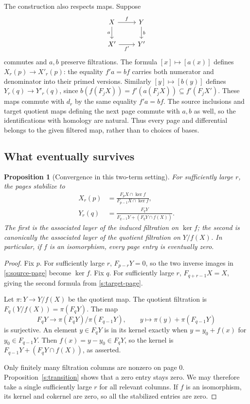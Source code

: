 \documentclass[11pt]{article}
\newtheorem{proposition}[theorem]{Proposition}
\theoremstyle{definition}
\theoremstyle{remark}\newtheorem{remark}[theorem]{Remark}
\DeclareMathOperator{\Ker}{ker}
\begin{document}
The construction also respects maps. Suppose
\[
\begin{tikzcd}
X\arrow[r,"f"]\arrow[d,"a"']&Y\arrow[d,"b"]\\
X'\arrow[r,"f'"']&Y'
\end{tikzcd}
\]
commutes and $a,b$ preserve filtrations. The formula $[x]\mapsto[a(x)]$
defines $X_r(p)\to X'_r(p)$: the equality $f'a=bf$ carries both numerator
and denominator into their primed versions. Similarly $[y]\mapsto[b(y)]$
defines $Y_r(q)\to Y'_r(q)$, since
$b(f(F_jX))=f'(a(F_jX))\subseteq f'(F_jX')$. These maps commute with
$d_r$ by the same equality $f'a=bf$. The source inclusions and target
quotient maps defining the next page commute with $a,b$ as well, so
the identifications with homology are natural. Thus every page and differential
belongs to the given filtered map, rather than to choices of bases.

\subsection{What eventually survives}

\begin{proposition}[Convergence in this two-term setting]\label{s:convergence}
For sufficiently large $r$, the pages stabilize to
\begin{align*}
X_r(p)&=
\frac{F_pX\cap\Ker f}{F_{p-1}X\cap\Ker f},\\
Y_r(q)&=
\frac{F_qY}{F_{q-1}Y+(F_qY\cap f(X))}.
\end{align*}
The first is the associated layer of the induced filtration on $\Ker f$;
the second is canonically the associated layer of the quotient filtration
on $Y/f(X)$. In particular, if $f$ is an isomorphism, every page entry
is eventually zero.
\end{proposition}

\begin{proof}
Fix $p$. For sufficiently large $r$, $F_{p-r}Y=0$, so the two inverse
images in \eqref{s:source-page} become $\Ker f$. Fix $q$. For sufficiently
large $r$, $F_{q+r-1}X=X$, giving the second formula from
\eqref{s:target-page}.

Let $\pi:Y\to Y/f(X)$ be the quotient map. The quotient filtration is
$F_q(Y/f(X))=\pi(F_qY)$. The map
\[
F_qY\longrightarrow\pi(F_qY)/\pi(F_{q-1}Y),\qquad
y\longmapsto\pi(y)+\pi(F_{q-1}Y)
\]
is surjective. An element $y\in F_qY$ is in its kernel exactly when
$y=y_0+f(x)$ for $y_0\in F_{q-1}Y$. Then $f(x)=y-y_0\in F_qY$,
so the kernel is $F_{q-1}Y+(F_qY\cap f(X))$, as asserted.

Only finitely many filtration columns are nonzero on page $0$.
Proposition~\ref{s:transition} shows that a zero entry stays zero.
We may therefore take a single sufficiently large $r$ for all relevant
columns. If $f$ is an isomorphism, its kernel and cokernel are zero,
so all the stabilized entries are zero.
\end{proof}
\end{document}
